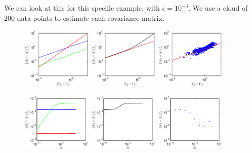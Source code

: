 \documentclass[12pt]{article}
\begin{document}
We can look at this for this specific example, with $\epsilon = 10^{-3}$. 
%
We use a cloud of $200$ data points to estimate each covariance matrix. 


\begin{figure}

\includegraphics[width=0.3\textwidth]{errors_function_dy}
\includegraphics[width=0.3\textwidth]{totaldist_function_dy}
\includegraphics[width=0.3\textwidth]{empirical_totaldist_function_dy}

\includegraphics[width=0.3\textwidth]{errors_function_dt}
\includegraphics[width=0.3\textwidth]{totaldist_function_dt}
\includegraphics[width=0.3\textwidth]{empirical_totaldist_function_dt}


\end{figure}
\end{document}
